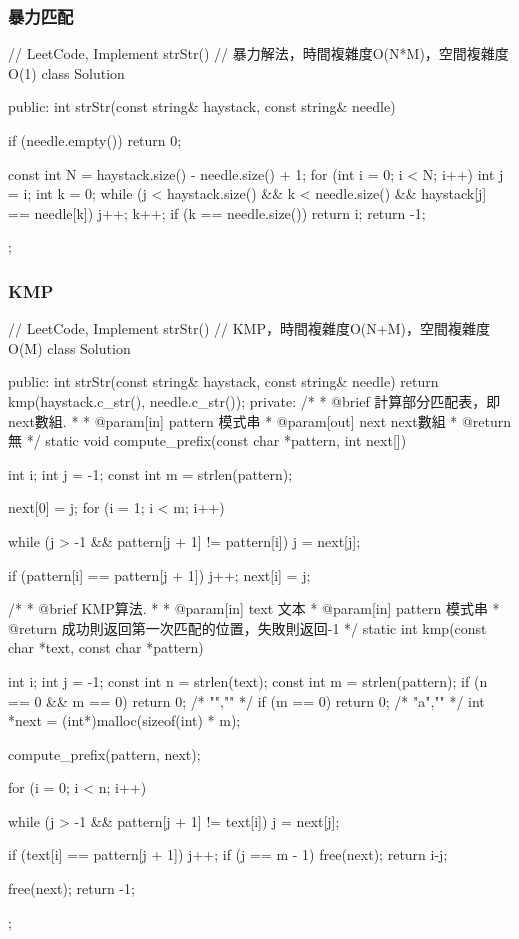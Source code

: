 \subsubsection{暴力匹配}
\begin{Code}
// LeetCode, Implement strStr()
// 暴力解法，時間複雜度O(N*M)，空間複雜度O(1)
class Solution {
public:
    int strStr(const string& haystack, const string& needle) {
        if (needle.empty()) return 0;

        const int N = haystack.size() - needle.size() + 1;
        for (int i = 0; i < N; i++) {
            int j = i;
            int k = 0;
            while (j < haystack.size() && k < needle.size() && haystack[j] == needle[k]) {
                j++;
                k++;
            }
            if (k == needle.size()) return i;
        }
        return -1;
    }
};
\end{Code}


\subsubsection{KMP}
\begin{Code}
// LeetCode, Implement strStr()
// KMP，時間複雜度O(N+M)，空間複雜度O(M)
class Solution {
public:
    int strStr(const string& haystack, const string& needle) {
        return kmp(haystack.c_str(), needle.c_str());
    }
private:
    /*
     * @brief 計算部分匹配表，即next數組.
     *
     * @param[in] pattern 模式串
     * @param[out] next next數組
     * @return 無
     */
    static void compute_prefix(const char *pattern, int next[]) {
        int i;
        int j = -1;
        const int m = strlen(pattern);

        next[0] = j;
        for (i = 1; i < m; i++) {
            while (j > -1 && pattern[j + 1] != pattern[i]) j = next[j];

            if (pattern[i] == pattern[j + 1]) j++;
            next[i] = j;
        }
    }

    /*
     * @brief KMP算法.
     *
     * @param[in] text 文本
     * @param[in] pattern 模式串
     * @return 成功則返回第一次匹配的位置，失敗則返回-1
     */
    static int kmp(const char *text, const char *pattern) {
        int i;
        int j = -1;
        const int n = strlen(text);
        const int m = strlen(pattern);
        if (n == 0 && m == 0) return 0; /* "","" */
        if (m == 0) return 0;  /* "a","" */
        int *next = (int*)malloc(sizeof(int) * m);

        compute_prefix(pattern, next);

        for (i = 0; i < n; i++) {
            while (j > -1 && pattern[j + 1] != text[i]) j = next[j];

            if (text[i] == pattern[j + 1]) j++;
            if (j == m - 1) {
                free(next);
                return i-j;
            }
        }

        free(next);
        return -1;
    }
};
\end{Code}


